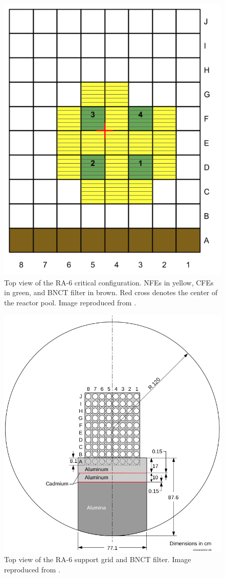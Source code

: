 \begin{figure}[htbp!] %
    \centering
    \includegraphics[width=0.40\linewidth]{figures/ra6-core2}
    \hfill
    \caption{Top view of the RA-6 critical configuration. NFEs in yellow, CFEs in green, and BNCT filter in brown. Red cross denotes the center of the reactor pool. Image reproduced from \cite{ICSBEP}.}
    \label{fig:ra6-1}
\end{figure}

\begin{figure}[htbp!] %
    \centering
    \includegraphics[width=0.60\linewidth]{figures/bnct}
    \hfill
    \caption{Top view of the RA-6 support grid and BNCT filter. Image reproduced from \cite{ICSBEP}.}
    \label{fig:ra6-2}
\end{figure}

